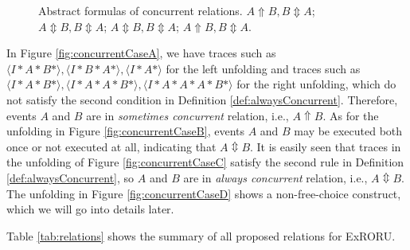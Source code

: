 \documentclass{llncs}
\begin{document}
\begin{figure}[htbp]
{\begin{minipage}[b]{0.3\textwidth}
	\end{minipage}
	\label{fig:concurrentCaseC}
}
\caption{Abstract formulas of concurrent relations.  $A\Uparrow B,B\Updownarrow A$;  $A\Updownarrow B,B\Updownarrow A$;  $A\Updownarrow B,B\Updownarrow A$;  $A\Uparrow B,B\Updownarrow A$.\label{fig:concurrentCases}}
\end{figure}

In Figure \ref{fig:concurrentCaseA}, we have traces such as $\langle I*A*B*\rangle ,\langle I*B*A*\rangle ,\langle I*A*\rangle $ for the left unfolding and traces such as $\langle I*A*B*\rangle ,\langle I*A*A*B*\rangle ,\langle I*A*A*A*B*\rangle$ for the right unfolding, which do not satisfy the second condition in Definition \ref{def:alwaysConcurrent}. Therefore, events $A$ and $B$ are in \textit{sometimes concurrent} relation, i.e., $A\Uparrow B$. As for the unfolding in Figure \ref{fig:concurrentCaseB}, events $A$ and $B$ may be executed both once or not executed at all, indicating that $A\Updownarrow B$. It is easily seen that traces in the unfolding of Figure \ref{fig:concurrentCaseC} satisfy the second rule in Definition \ref{def:alwaysConcurrent}, so $A$ and $B$ are in \textit{always concurrent} relation, i.e., $A\Updownarrow B$. The unfolding in Figure \ref{fig:concurrentCaseD} shows a non-free-choice construct, which we will go into details later.

Table \ref{tab:relations} shows the summary of all proposed relations for ExRORU.
\end{document}
